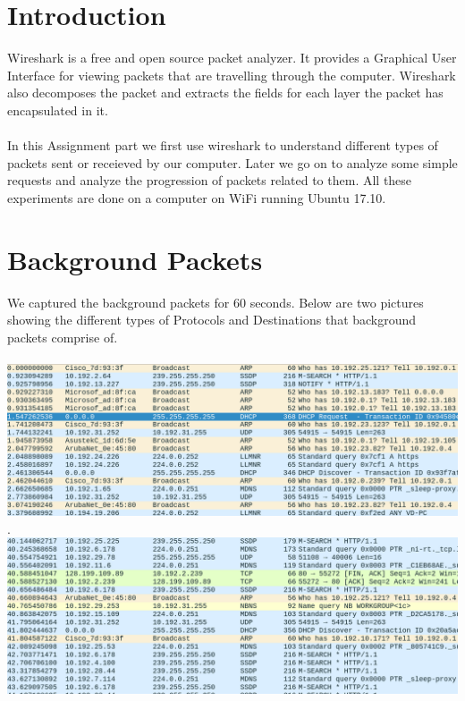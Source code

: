 \documentclass[12pt]{article}
\author{
  Singhal, Madhur\\
  \texttt{2015CS10235}
  \and
  Chhajwani, Anant\\
  \texttt{2015CS50281}
}
\begin{document}
\maketitle


\section{Introduction}
Wireshark is a free and open source packet analyzer. It provides a Graphical User Interface for viewing packets that are travelling through the computer. Wireshark also decomposes the packet and extracts the fields for each layer the packet has encapsulated in it.


\paragraph{}
In this Assignment part we first use wireshark to understand different types of packets sent or receieved by our computer. Later we go on to analyze some simple requests and analyze the progression of packets related to them. All these experiments are done on a computer on WiFi running Ubuntu 17.10.

\section{Background Packets}

We captured the background packets for 60 seconds. Below are two pictures showing the different types of Protocols and Destinations that background packets comprise of.

\paragraph{}
\begin{center}
\includegraphics[scale=0.4]{f3}
.
\includegraphics[scale=0.4]{f4}

\end{center}
\end{document}
